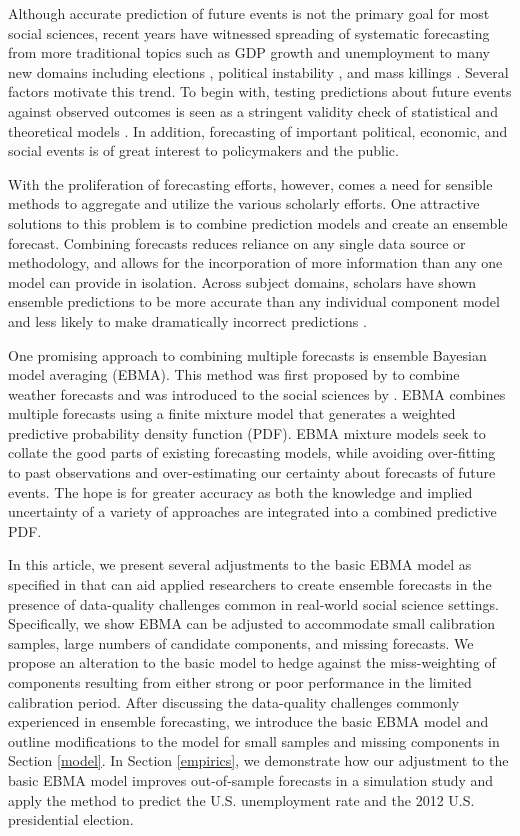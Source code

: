 \documentclass[12pt,fullpage,endnotes]{article}
\begin{document}
Although accurate prediction of future events is not the primary goal
for most social sciences, recent years have witnessed spreading of
systematic forecasting from more traditional topics such as GDP growth
and unemployment to many new domains including elections
\citep[e.g.,][]{Linzer:2013}, political instability
\citep[e.g.,][]{Goldstone:etal:2010}, and mass killings
\citep{Ulfelder:2012}. Several factors motivate this trend. To begin
with, testing predictions about future events against observed
outcomes is seen as a stringent validity check of statistical and
theoretical models \citep{wgb:2010}. In addition, forecasting of
important political, economic, and social events is of great interest
to policymakers and the public.


With the proliferation of forecasting efforts, however, comes a need
for sensible methods to aggregate and utilize the various scholarly
efforts. One attractive solutions to this problem is to combine
prediction models and create an ensemble forecast. Combining forecasts
reduces reliance on any single data source or methodology, and allows
for the incorporation of more information than any one model can
provide in isolation. Across subject domains, scholars have shown
ensemble predictions to be more accurate than any individual component
model and less likely to make dramatically incorrect predictions
\citep{Bates:1969,Armstrong:2001,Raftery:2005}.

One promising approach to combining multiple forecasts is ensemble
Bayesian model averaging (EBMA). This method was first proposed by
\citet{Raftery:2005} to combine weather forecasts and was introduced
to the social sciences by \citet{mhw:2012}. EBMA combines multiple
forecasts using a finite mixture model that generates a weighted
predictive probability density function (PDF). EBMA mixture models
seek to collate the good parts of existing forecasting models, while
avoiding over-fitting to past observations and over-estimating our
certainty about forecasts of future events. The hope is for greater
accuracy as both the knowledge and implied uncertainty of a variety of
approaches are integrated into a combined predictive PDF.

In this article, we present several adjustments to the basic EBMA
model as specified in \citet{mhw:2012} that can aid applied
researchers to create ensemble forecasts in the presence of
data-quality challenges common in real-world social science settings.
Specifically, we show EBMA can be adjusted to accommodate small
calibration samples, large numbers of candidate components, and
missing forecasts.  We propose an alteration to the basic model to
hedge against the miss-weighting of components resulting from either
strong or poor performance in the limited calibration period.  After
discussing the data-quality challenges commonly experienced in
ensemble forecasting, we introduce the basic EBMA model and outline
modifications to the model for small samples and missing components in
Section \ref{model}. In Section \ref{empirics}, we demonstrate how our
adjustment to the basic EBMA model improves out-of-sample forecasts in
a simulation study and apply the method to predict the
U.S. unemployment rate and the 2012 U.S. presidential election.
\end{document}
